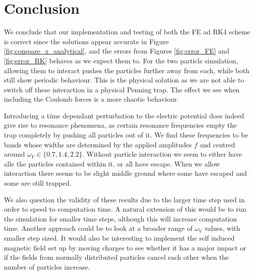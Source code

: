 \section{Conclusion}\label{sec:conclusion}

We conclude that our implementation and testing of both the FE ad RK4 scheme is correct since the solutions appear accurate in Figure \ref{fig:compare_z_analytical}, and the errors from Figures \ref{fig:error_FE} and \ref{fig:error_RK} behaves as we expect them to. For the two particle simulation, allowing them to interact pushes the particles further away from each, while both still show periodic behaviour. This is the physical solution as we are not able to switch off these interaction in a physical Penning trap. The effect we see when including the Coulomb forces is a more chaotic behaviour. 

Introducing a time dependant perturbation to the electric potential does indeed give rise to resonance phenomena, as certain resonance frequencies empty the trap completely by pushing all particles out of it. We find these frequencies to be bands whose widths are determined by the applied amplitudes $f$ and centred around $\omega_V\in\{0.7, 1.4, 2.2\}$. Without particle interaction we seem to either have alle the particles contained within it, or all have escape. When we allow interaction there seems to be slight middle ground where some have escaped and some are still trapped. 

We also question the validity of these results due to the larger time step used in order to speed to computation time. A natural extension of this would be to run the simulation for smaller time steps, although this will increase computation time. Another approach could be to look at a broader range of $\omega_V$ values, with smaller step sized. It would also be interesting to implement the self induced magnetic field set up by moving charges to see whether it has a major impact or if the fields from normally distributed particles cancel each other when the number of particles increase. 

